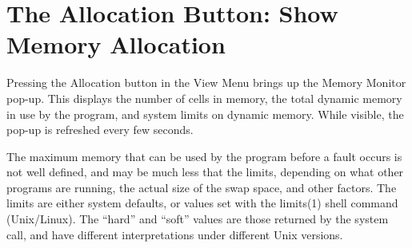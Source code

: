 \section{The {\cb Allocation} Button: Show Memory Allocation}
Pressing the {\cb Allocation} button in the {\cb View Menu} brings up
the {\cb Memory Monitor} pop-up.  This displays the number of cells in
memory, the total dynamic memory in use by the program, and system
limits on dynamic memory.  While visible, the pop-up is refreshed
every few seconds.

The maximum memory that can be used by the program before a fault
occurs is not well defined, and may be much less that the limits,
depending on what other programs are running, the actual size of the
swap space, and other factors.  The limits are either system defaults,
or values set with the {\vt limits}(1) shell command (Unix/Linux). 
The ``hard'' and ``soft'' values are those returned by the system
call, and have different interpretations under different Unix
versions.

